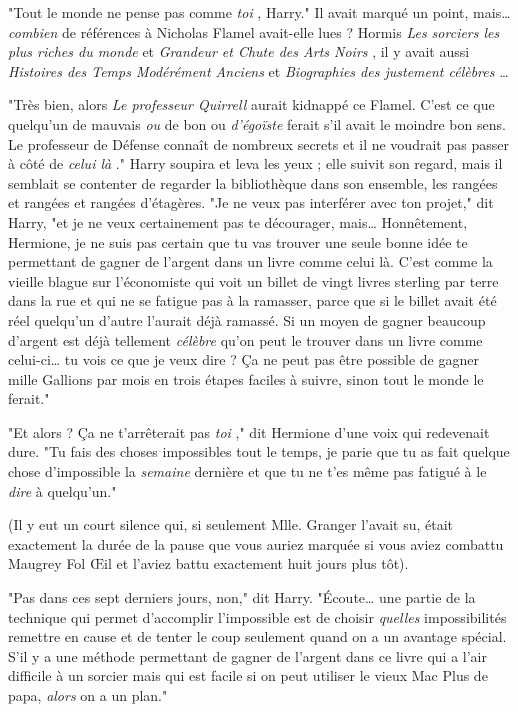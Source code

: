 "Tout le monde ne pense pas comme \emph{toi} , Harry." Il avait marqué un point, mais… \emph{combien}  de références à Nicholas Flamel avait-elle lues ? Hormis \emph{Les sorciers les plus riches du monde}  et \emph{Grandeur et Chute des Arts Noirs} , il y avait aussi \emph{Histoires des Temps Modérément Anciens}  et \emph{Biographies des justement célèbres} …

"Très bien, alors \emph{Le professeur Quirrell}  aurait kidnappé ce Flamel. C'est ce que quelqu'un de mauvais \emph{ou}  de bon ou \emph{d'égoïste}  ferait s'il avait le moindre bon sens. Le professeur de Défense connaît de nombreux secrets et il ne voudrait pas passer à côté de \emph{celui là} ." Harry soupira et leva les yeux ; elle suivit son regard, mais il semblait se contenter de regarder la bibliothèque dans son ensemble, les rangées et rangées et rangées d'étagères. "Je ne veux pas interférer avec ton projet," dit Harry, "et je ne veux certainement pas te décourager, mais… Honnêtement, Hermione, je ne suis pas certain que tu vas trouver une seule bonne idée te permettant de gagner de l'argent dans un livre comme celui là. C'est comme la vieille blague sur l'économiste qui voit un billet de vingt livres sterling par terre dans la rue et qui ne se fatigue pas à la ramasser, parce que si le billet avait été réel quelqu'un d'autre l'aurait déjà ramassé. Si un moyen de gagner beaucoup d'argent est déjà tellement \emph{célèbre}  qu'on peut le trouver dans un livre comme celui-ci… tu vois ce que je veux dire ? Ça ne peut pas être possible de gagner mille Gallions par mois en trois étapes faciles à suivre, sinon tout le monde le ferait."

"Et alors ? Ça ne t'arrêterait pas \emph{toi} ," dit Hermione d'une voix qui redevenait dure. "Tu fais des choses impossibles tout le temps, je parie que tu as fait quelque chose d'impossible la \emph{semaine}  dernière et que tu ne t'es même pas fatigué à le \emph{dire}  à quelqu'un."

(Il y eut un court silence qui, si seulement Mlle. Granger l'avait su, était exactement la durée de la pause que vous auriez marquée si vous aviez combattu Maugrey Fol Œil et l'aviez battu exactement huit jours plus tôt).

"Pas dans ces sept derniers jours, non," dit Harry. "Écoute… une partie de la technique qui permet d'accomplir l'impossible est de choisir \emph{quelles}  impossibilités remettre en cause et de tenter le coup seulement quand on a un avantage spécial. S'il y a une méthode permettant de gagner de l'argent dans ce livre qui a l'air difficile à un sorcier mais qui est facile si on peut utiliser le vieux Mac Plus de papa, \emph{alors}  on a un plan."

